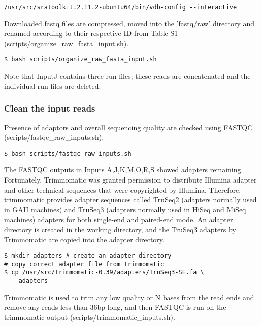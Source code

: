 \documentclass{article}
\begin{document}
\begin{sloppypar}
\begin{verbatim}
/usr/src/sratoolkit.2.11.2-ubuntu64/bin/vdb-config --interactive
\end{verbatim}

Downloaded fastq files are compressed, moved into the 'fastq/raw' directory and renamed according to their respective ID from Table S1 ({\selectfont scripts/organize\_raw\_fasta\_input.sh}).

\begin{verbatim}
$ bash scripts/organize_raw_fasta_input.sh
\end{verbatim}

Note that InputJ contains three run files; these reads are concatenated and the individual run files are deleted.

\subsubsection{Clean the input reads}

Presence of adaptors and overall sequencing quality are checked using FASTQC ({\selectfont scripts/fastqc\_raw\_inputs.sh}). 

\begin{verbatim}
$ bash scripts/fastqc_raw_inputs.sh
\end{verbatim}

The FASTQC outputs in Inputs A,J,K,M,O,R,S showed adapters remaining. Fortunately, Trimmomatic was granted permission to distribute Illumina adapter and other technical sequences that were copyrighted by Illumina. Therefore, trimmomatic provides adapter sequences called TruSeq2 (adapters normally used in GAII machines) and TruSeq3 (adapters normally used in HiSeq and MiSeq machines) adapters for both single-end and paired-end mode. An adapter directory is created in the working directory, and the TruSeq3 adapters by Trimmomatic are copied into the adapter directory.

\begin{verbatim}
$ mkdir adapters # create an adapter directory
# copy correct adapter file from Trimmomatic
$ cp /usr/src/Trimmomatic-0.39/adapters/TruSeq3-SE.fa \
    adapters
\end{verbatim}

Trimmomatic is used to trim any low quality or N bases from the read ends and remove any reads less than 36bp long, and then FASTQC is run on the trimmomatic output ({\selectfont scripts/trimmomatic\_inputs.sh}). 


\end{sloppypar}
\end{document}
